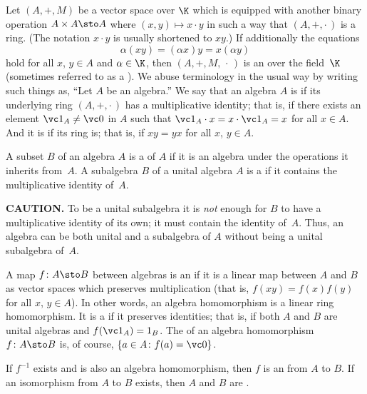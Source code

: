 \begin{defn}\label{defn_alg} Let $(A,+,M)$ be a vector space over $\K$ which is equipped with
another binary operation $A \times A \sto A$ where $(x,y) \mapsto x \cdot y$ in such
a way that $(A,+,\cdot\,)$ is a ring. (The notation $x \cdot y$ is usually shortened to $xy$.) If additionally the equations
  \begin{equation}\label{eq_def_algebra}
     \alpha (xy) = (\alpha x)y = x(\alpha y)
  \end{equation}
hold for all $x$, $y \in A$ and $\alpha \in \K$, then $(A,+,M,\,\cdot\,)$ is an
 over the field~$\K$ (sometimes referred to as a ).  We abuse terminology in the usual way by writing such things as, ``Let $A$ be an
algebra.'' We say that an algebra $A$ is
 if its underlying ring $(A,+,\cdot\,)$ has a multiplicative identity; that is, if there exists
an element $\vc 1_A \ne \vc 0$ in $A$ such that $\vc 1_A \cdot x = x \cdot \vc 1_A = x$ for all $x \in A$.
  And it is
 if its ring is; that is, if $xy = yx$ for all $x$, $y \in A$.

A subset $B$ of an algebra $A$ is a
 of $A$ if it is an algebra under the operations it inherits from~$A$.  A
subalgebra $B$ of a unital algebra $A$ is a
 if it contains the multiplicative identity of~$A$.

\textbf{CAUTION.} To be a unital subalgebra it is \emph{not} enough for $B$ to have a
multiplicative identity of its own; it must contain the identity of~$A$.  Thus, an
algebra can be both unital and a subalgebra of $A$ without being a unital subalgebra
of~$A$.

A map $f\colon A \sto B$ between algebras is an
 if it is a linear map between $A$ and $B$ as vector spaces which preserves multiplication
(that is, $f(xy) = f(x)f(y)$ for all $x$, $y \in A$).  In other words, an algebra homomorphism is a linear ring homomorphism.
It is a
 if it preserves identities; that is, if both $A$ and $B$ are unital algebras and $f(\vc 1_A) = 1_B$.
The
 of an algebra homomorphism $f\colon A \sto B$ is, of course, $\{a \in A \colon f(a) = \vc 0\}$.

If $f^{-1}$ exists and is also an algebra homomorphism, then $f$ is an
 from $A$ to $B$.  If an isomorphism from $A$ to $B$ exists, then $A$ and
$B$ are
.
\end{defn}

